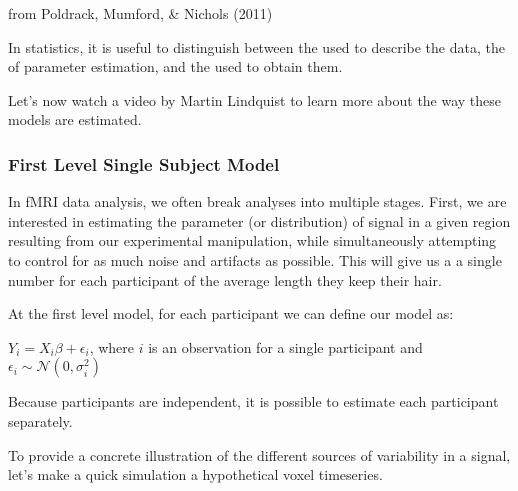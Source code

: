 \documentclass[letterpaper,10pt,english]{sphinxmanual}
\begin{document}
from Poldrack, Mumford, \& Nichols (2011)

In statistics, it is useful to distinguish between the  used to describe the data, the  of parameter estimation, and the  used to obtain them.

Let’s now watch a video by Martin Lindquist to learn more about the way these models are estimated.

\begin{sphinxVerbatim}[commandchars=\\\{\}]
\end{sphinxVerbatim}

\noindent{}


\subsubsection{First Level \sphinxhyphen{} Single Subject Model}
\label{\detokenize{content/Group_Analysis:first-level-single-subject-model}}
In fMRI data analysis, we often break analyses into multiple stages. First, we are interested in estimating the parameter (or distribution) of signal in a given region resulting from our experimental manipulation, while simultaneously attempting to control for as much noise and artifacts as possible. This will give us a a single number for each participant of the average length they keep their hair.

At the first level model, for each participant we can define our model as:

\(Y_i = X_i\beta + \epsilon_i\), where \(i\) is an observation for a single participant and \(\epsilon_i \sim \mathcal{N}(0, \sigma_i^2)\)

Because participants are independent, it is possible to estimate each participant separately.

To provide a concrete illustration of the different sources of variability in a signal, let’s make a quick simulation a hypothetical voxel timeseries.
\end{document}
